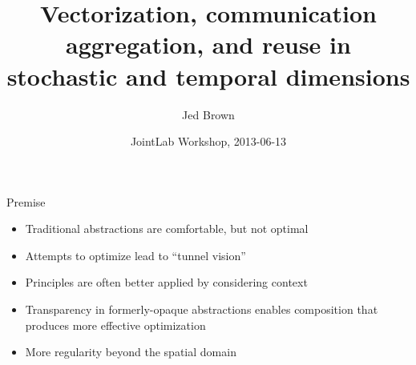 \documentclass{beamer}
\title{Vectorization, communication aggregation, and reuse in stochastic and temporal dimensions}
\author{Jed Brown}
\institute
{
  Mathematics and Computer Science Division, Argonne National Laboratory
}
\date{JointLab Workshop, 2013-06-13}
\begin{document}
\lstset{language=C}
\normalem

\begin{frame}
  \titlepage
\end{frame}



\begin{frame}{Premise}
  \begin{itemize}
  \item Traditional abstractions are comfortable, but not optimal
  \item Attempts to optimize lead to ``tunnel vision''
  \item Principles are often better applied by considering context
  \item Transparency in formerly-opaque abstractions enables composition that produces more effective optimization
  \item More regularity beyond the spatial domain
  \end{itemize}
\end{frame}


\end{document}
